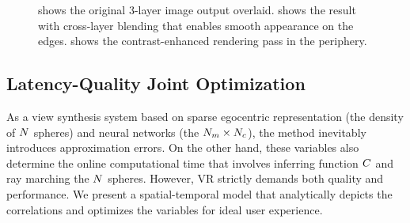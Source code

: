 \begin{figure}[htb]
    \centering
    \hspace{1em}
    \hspace{1em}
    {%
     shows the original 3-layer image output overlaid.
     shows the result with cross-layer blending that enables smooth appearance on the edges.
     shows the contrast-enhanced rendering pass in the periphery.
    }
    \label{fig:method:blending}
\end{figure}

\subsection{Latency-Quality Joint Optimization}
\label{sec:method:optimization}
As a view synthesis system based on sparse egocentric representation (the density of $N$ spheres) and neural networks (the $N_{m}\times N_{c}$), the method inevitably introduces approximation errors. On the other hand, these variables also determine the online computational time that involves inferring function $C$ and ray marching the $N$ spheres. 
However, VR strictly demands both quality and performance. We present a spatial-temporal model that analytically depicts the correlations and optimizes the variables for ideal user experience.

